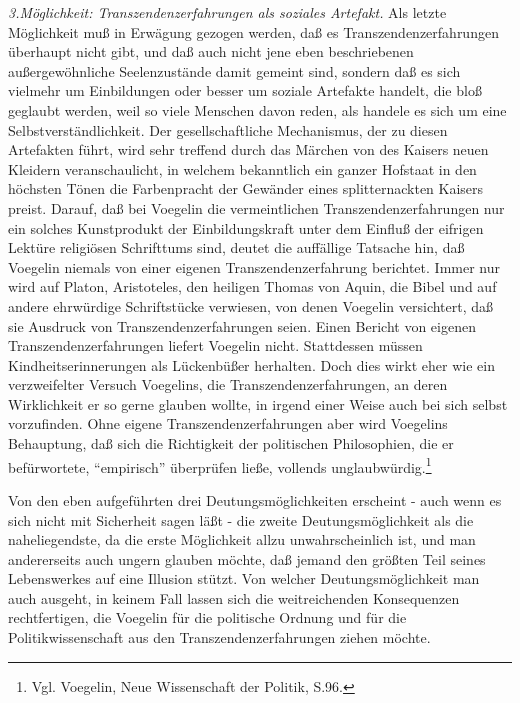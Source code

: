 {\it 3.Möglichkeit: Transzendenzerfahrungen als soziales Artefakt.} Als letzte
Möglichkeit muß in Erwägung gezogen werden, daß es Transzendenzerfahrungen
überhaupt nicht gibt, und daß auch nicht jene eben beschriebenen
außergewöhnliche Seelenzustände damit gemeint sind, sondern daß es sich
vielmehr um Einbildungen oder besser um soziale Artefakte handelt, die bloß
geglaubt werden, weil so viele Menschen davon reden, als handele es sich um
eine Selbstverständlichkeit. Der gesellschaftliche Mechanismus, der zu diesen
Artefakten führt, wird sehr treffend durch das Märchen von des Kaisers neuen
Kleidern veranschaulicht, in welchem bekanntlich ein ganzer Hofstaat in den
höchsten Tönen die Farbenpracht der Gewänder eines splitternackten Kaisers
preist. Darauf, daß bei Voegelin die vermeintlichen Transzendenzerfahrungen
nur ein solches Kunstprodukt der Einbildungskraft unter dem Einfluß der
eifrigen Lektüre religiösen Schrifttums sind, deutet die auffällige Tatsache
hin, daß Voegelin niemals von einer eigenen Transzendenzerfahrung berichtet.
Immer nur wird auf Platon, Aristoteles, den heiligen Thomas von Aquin, die
Bibel und auf andere ehrwürdige Schriftstücke verwiesen, von denen Voegelin
versichtert, daß sie Ausdruck von Transzendenzerfahrungen seien. Einen Bericht
von eigenen Transzendenzerfahrungen liefert Voegelin nicht.  Stattdessen
müssen Kindheitserinnerungen als Lückenbüßer herhalten. Doch dies wirkt eher
wie ein verzweifelter Versuch Voegelins, die Transzendenzerfahrungen, an deren
Wirklichkeit er so gerne glauben wollte, in irgend einer Weise auch bei sich
selbst vorzufinden. Ohne eigene Transzendenzerfahrungen aber wird Voegelins
Behauptung, daß sich die Richtigkeit der politischen Philosophien, die er
befürwortete, "`empirisch"' überprüfen ließe, vollends
unglaubwürdig.\footnote{Vgl. Voegelin, Neue Wissenschaft der Politik, S.96.}

Von den eben aufgeführten drei Deutungsmöglichkeiten erscheint - auch wenn es
sich nicht mit Sicherheit sagen läßt - die zweite Deutungsmöglichkeit als die
naheliegendste, da die erste Möglichkeit allzu unwahrscheinlich ist, und man
andererseits auch ungern glauben möchte, daß jemand den größten Teil seines
Lebenswerkes auf eine Illusion stützt. Von welcher Deutungsmöglichkeit man
auch ausgeht, in keinem Fall lassen sich die weitreichenden Konsequenzen
rechtfertigen, die Voegelin für die politische Ordnung und für die
Politikwissenschaft aus den Transzendenzerfahrungen ziehen möchte.



















